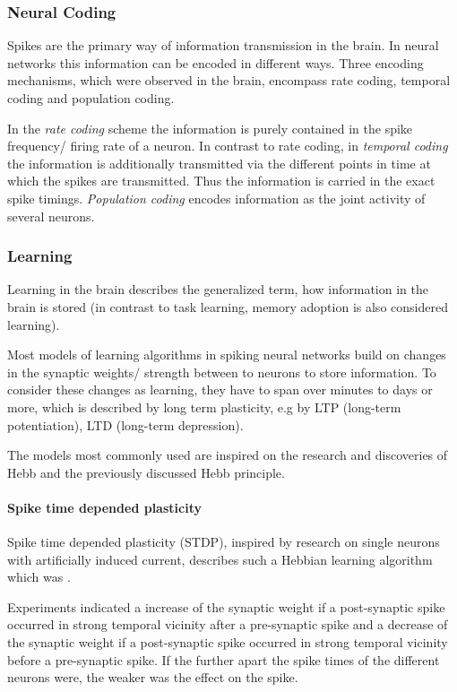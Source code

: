 \subsubsection{Neural Coding}

Spikes are the primary way of information transmission in the brain.
In neural networks this information can be encoded in different ways.
Three encoding mechanisms, which were observed in the brain, encompass rate coding, temporal coding and population coding.

In the \textit{rate coding} scheme the information is purely contained in the spike frequency/ firing rate of a neuron.
In contrast to rate coding, in \textit{temporal coding} the information is additionally transmitted via the different points in time at which the spikes are transmitted. 
Thus the information is carried in the exact spike timings.
\textit{Population coding} encodes information as the joint activity of several neurons.  

\subsubsection{Learning}

Learning in the brain describes the generalized term, how information in the brain is stored (in contrast to task learning, memory adoption is also considered learning).

Most models of learning algorithms in spiking neural networks build on changes in the synaptic weights/ strength between to neurons to store information.
To consider these changes as learning, they have to span over minutes to days or more, which is described by long term plasticity, e.g by LTP (long-term potentiation), LTD (long-term depression).
 
The models most commonly used are inspired on the research and discoveries of Hebb and the previously discussed Hebb principle.

\paragraph{Spike time depended plasticity}

Spike time depended plasticity (STDP), inspired by research on single neurons with artificially induced current, describes such a Hebbian learning algorithm which was .

Experiments indicated a increase of the synaptic weight if a post-synaptic spike occurred in strong temporal vicinity after a pre-synaptic spike and a decrease of the synaptic weight if a post-synaptic spike occurred in strong temporal vicinity before a pre-synaptic spike.
If the further apart the spike times of the different neurons were, the weaker was the effect on the spike.

